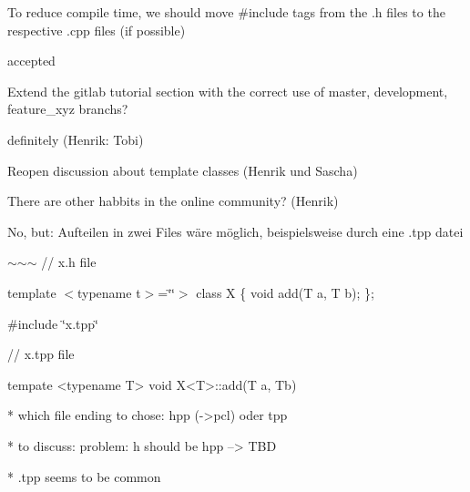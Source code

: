 \begin{DoxyEnumerate}
\item To reduce compile time, we should move \#include tags from the .h files to the respective .cpp files (if possible)
\begin{DoxyItemize}
\item accepted
\end{DoxyItemize}
\end{DoxyEnumerate}
\begin{DoxyEnumerate}
\item Extend the gitlab tutorial section with the correct use of master, development, feature\+\_\+xyz branchs?
\begin{DoxyItemize}
\item definitely (Henrik\+: Tobi)
\end{DoxyItemize}
\end{DoxyEnumerate}
\begin{DoxyEnumerate}
\item Reopen discussion about template classes (Henrik und Sascha)
\begin{DoxyItemize}
\item There are other habbits in the online community? (Henrik)
\item No, but\+: Aufteilen in zwei Files wäre möglich, beispielsweise durch eine .tpp datei
\end{DoxyItemize}

$\sim$$\sim$$\sim$ // x.\+h file

template $<$typename t$>$=\char`\"{}\char`\"{}$>$ class X \{ void add(\+T a, T b); \};

\#include \char`\"{}x.\+tpp\char`\"{}
\end{DoxyEnumerate}

\begin{DoxyVerb}// x.tpp file

tempate <typename T>
void X<T>::add(T a, Tb) {}
~~~


* which file ending to chose: hpp (->pcl) oder tpp

* to discuss: problem: h should be hpp --> TBD

* .tpp seems to be common
\end{DoxyVerb}



